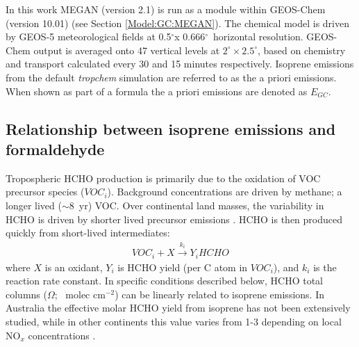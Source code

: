 \documentclass[acp, manuscript]{copernicus}
\newcommand{\parencite}{\citep}
\newcommand{\apri}{E_{GC}} %
\newcommand{\degr}{$^{\circ}$}
\newcommand{\moleccm}{~molec cm$^{-2}$}
\newcommand{\lowhr}{$2^{\circ} \times 2.5^{\circ}$}
\begin{document}
    In this work MEGAN (version 2.1) is run as a module within GEOS-Chem (version 10.01) (see Section \ref{Model:GC:MEGAN}).
    The chemical model is driven by GEOS-5 meteorological fields at 0.5\degr x 0.666\degr ~horizontal resolution.
    GEOS-Chem output is averaged onto 47 vertical levels at \lowhr, based on chemistry and transport calculated every 30 and 15 minutes respectively.
    Isoprene emissions from the default \textit{tropchem} simulation are referred to as the a priori emissions.
    When shown as part of a formula the a priori emissions are denoted as $\apri$.
    
    
  \subsection{Relationship between isoprene emissions and formaldehyde}
    \label{BioIsop:method:slope}
    
    
    Tropospheric HCHO production is primarily due to the oxidation of VOC precursor species ($VOC_i$).
    Background concentrations are driven by methane; a longer lived ($\sim 8$~yr) VOC.
    Over continental land masses, the variability in HCHO is driven by shorter lived precursor emissions \parencite{Chance2000,Palmer2003}.
    HCHO is then produced quickly from short-lived intermediates:
    \begin{eqnarray*}
      VOC_i + X \overset{k_i}{\rightarrow} Y_i HCHO
    \end{eqnarray*}
    where $X$ is an oxidant, $Y_i$ is HCHO yield (per C atom in $VOC_i$), and $k_i$ is the reaction rate constant.
    In specific conditions described below, HCHO total columns ($\Omega$; \moleccm) can be linearly related to isoprene emissions.
    In Australia the effective molar HCHO yield from isoprene has not been extensively studied, while in other continents this value varies from 1-3 depending on local NO$_x$ concentrations \parencite[e.g.,][]{Palmer2006, Millet2006, Bauwens2016, Surl2018}.
    
\end{document}
